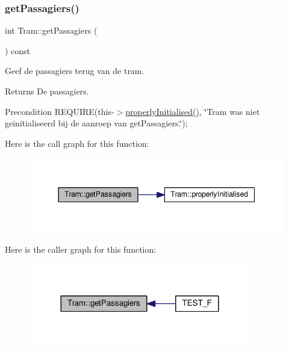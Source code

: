 \subsubsection{\texorpdfstring{get\+Passagiers()}{getPassagiers()}}
{\footnotesize\ttfamily int Tram\+::get\+Passagiers (\begin{DoxyParamCaption}{ }\end{DoxyParamCaption}) const}



Geef de passagiers terug van de tram. 

\begin{DoxyReturn}{Returns}
De passagiers. 
\end{DoxyReturn}
\begin{DoxyPrecond}{Precondition}
R\+E\+Q\+U\+I\+RE(this-\/$>$\hyperlink{class_tram_ac2688f590e4db232b4f535c9bf959efb}{properly\+Initialised()}, \char`\"{}\+Tram was niet geinitialiseerd bij de aanroep van get\+Passagiers.\char`\"{}); 
\end{DoxyPrecond}
Here is the call graph for this function\+:\nopagebreak
\begin{figure}[H]
\begin{center}
\leavevmode
\includegraphics[width=344pt]{class_tram_a678ba2cd0c6ab76e966947944f599d56_cgraph}
\end{center}
\end{figure}
Here is the caller graph for this function\+:\nopagebreak
\begin{figure}[H]
\begin{center}
\leavevmode
\includegraphics[width=276pt]{class_tram_a678ba2cd0c6ab76e966947944f599d56_icgraph}
\end{center}
\end{figure}
\mbox{\label{class_tram_aa8bcd980469801cb8524f170006f666c}} 
